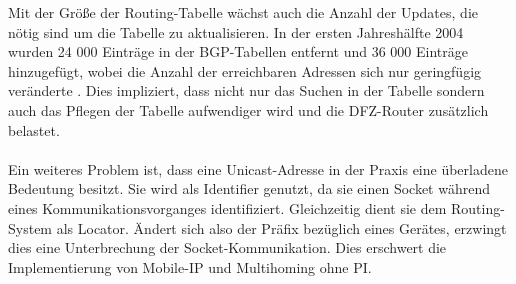 Mit der Größe der Routing-Tabelle wächst auch die Anzahl der Updates, die nötig sind um die Tabelle zu aktualisieren. In der ersten Jahreshälfte 2004 wurden 24 000 Einträge in der BGP-Tabellen entfernt und 36 000 Einträge hinzugefügt, wobei die Anzahl der erreichbaren Adressen sich nur geringfügig veränderte \cite{journals/ccr/MengXZHLZ04}. Dies impliziert, dass nicht nur das Suchen in der Tabelle sondern auch das Pflegen der Tabelle aufwendiger wird und die DFZ-Router zusätzlich belastet.

\paragraph{} 
Ein weiteres Problem ist, dass eine Unicast-Adresse in der Praxis eine überladene Bedeutung besitzt. Sie wird als Identifier genutzt, da sie einen Socket während eines Kommunikationsvorganges identifiziert. Gleichzeitig dient sie dem Routing-System als Locator. Ändert sich also der Präfix bezüglich eines Gerätes, erzwingt dies eine Unterbrechung der Socket-Kommunikation. Dies erschwert die Implementierung von Mobile-IP und Multihoming ohne PI.



